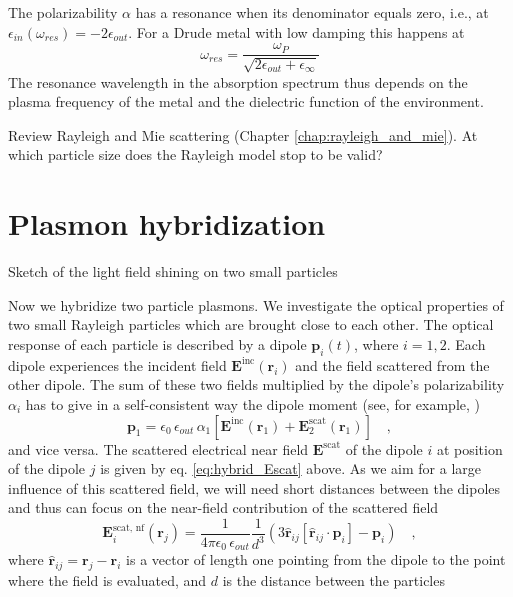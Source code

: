 The polarizability $\alpha$ has a resonance when its denominator equals zero, i.e., at $\epsilon_{in} (\omega_{res}) = -2 \epsilon_{out}$. For a Drude metal with low damping this happens at
\begin{equation}
\omega_{res} = \frac{\omega_P}{\sqrt{2 \epsilon_{out} + \epsilon_\infty}}
\end{equation}
The resonance wavelength in the absorption spectrum thus depends on 
the plasma frequency of the metal and  the dielectric function of the environment. 


\begin{questions}
\item Review Rayleigh and Mie scattering (Chapter \ref{chap:rayleigh_and_mie}). At which particle size does the Rayleigh model stop to be valid?
\end{questions}


\section{Plasmon hybridization}

\begin{marginfigure}
\caption{Sketch of the light field shining on two small particles}
\end{marginfigure}


Now we hybridize two particle plasmons. We investigate the optical properties of two small Rayleigh particles which are brought close to each other.  The optical response of each particle is described by  a dipole $ \mathbf{p}_i(t)$, where $i = 1,2$.
 Each dipole experiences the incident field
$\mathbf{E}^{\text{inc}}(\mathbf{r}_i)$ and the field scattered from the other dipole.
The sum of these two fields multiplied by the dipole's polarizability $\alpha_i$
has to give in a self-consistent way the dipole moment (see, for example, \cite{Myroshnychenko08})
%
\begin{equation} \label{eq:hbyrid_equationsystem}
     \mathbf{p}_1 = \epsilon_0 \,  \epsilon_{out} \,  \alpha_1 \left[ \mathbf{E}^{\text{inc}} (\mathbf{r}_1) +
\mathbf{E}^{\text{scat}}_2(\mathbf{r}_1) \right] \quad ,
\end{equation}
%
and vice versa. The scattered electrical near field $ \mathbf{E}^{\text{scat}}$ of the dipole $i$ at position of the dipole $j$ is given by eq.   \ref{eq:hybrid_Escat} above. As we aim  for a large influence of this scattered field, we will need short distances between the dipoles and thus can focus on the near-field contribution of the scattered field
\begin{equation}
  \mathbf{E}^{\text{scat, nf}}_i(\mathbf{r}_j) = \frac{ 1 }{4\pi\epsilon_0 \, \epsilon_{out}}  \frac{1}{d^3}
        \left( 3\hat{\mathbf{r}}_{ij} \left[\hat{\mathbf{r}}_{ij} \cdot \mathbf{p}_i \right] - \mathbf{p}_i \right)
  \quad ,
\end{equation}
where $\hat{\mathbf{r}}_{ij}   = \mathbf{r} _j - \mathbf{r} _i$ is a vector of length one pointing from the dipole to the point where
the field is evaluated, and $d$ is the distance between the particles


